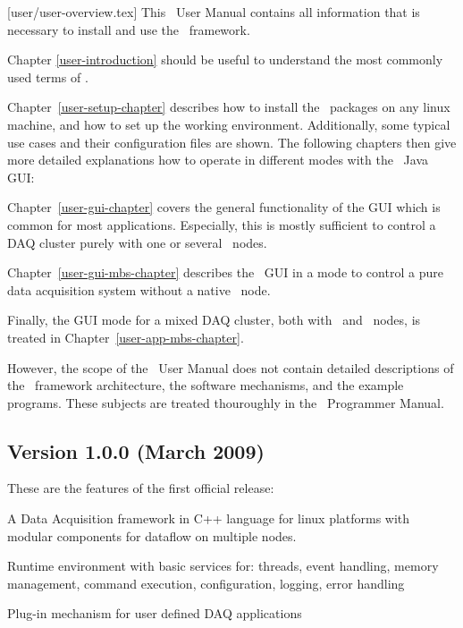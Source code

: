 [user/user-overview.tex]
This \dabc\ User Manual contains all information that is necessary to
install and use the \dabc\ framework.

Chapter \ref{user-introduction} should be useful to understand the
most commonly used terms of \dabc.

Chapter~\ref{user-setup-chapter} describes how to install the
\dabc\ packages on any linux machine, and how to set up the working
environment. Additionally, some typical use cases and their configuration
files are shown. 
The following chapters then give more detailed explanations how to operate
in different modes with the \dabc\ Java GUI:

Chapter~\ref{user-gui-chapter}
covers the general functionality of the GUI
which is common for most applications. Especially, this 
is mostly sufficient
to control a DAQ cluster purely with one or several \dabc\ nodes.

Chapter~\ref{user-gui-mbs-chapter} describes the \dabc\ GUI 
in a mode to control a pure \mbs data acquisition system without 
a native \dabc\ node.

Finally, the GUI mode for a mixed DAQ cluster, both with \dabc\ and \mbs\ nodes, is
treated in Chapter~\ref{user-app-mbs-chapter}.

However, the scope of the \dabc\ User Manual does not contain 
detailed descriptions of the \dabc\ framework architecture, 
the software mechanisms, and the example programs. 
These subjects are treated thouroughly
in the \dabc\ Programmer Manual.


\subsection{Version 1.0.0 (March 2009)}
These are the features of the first official release:
\bnum
\item A Data Acquisition framework in C++ language for linux platforms
   with modular components for dataflow on multiple nodes.
   
\item Runtime environment with basic services for:
   threads, event handling, memory management, command execution, 
   configuration, logging, error handling

\item Plug-in mechanism for user defined DAQ applications

